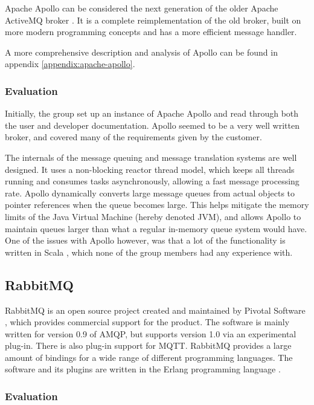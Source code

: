 Apache Apollo can be considered the next generation of the older Apache ActiveMQ broker \cite{activemq}. It is a complete reimplementation of the old broker, built on more modern programming concepts and has a more efficient message handler.

A more comprehensive description and analysis of Apollo can be found in appendix \ref{appendix:apache-apollo}.

\subsubsection{Evaluation}
\label{subsec:prestudies-existing_solutions-apache_apollo-evaluation}

Initially, the group set up an instance of Apache Apollo and read through both the user and developer documentation. Apollo seemed to be a very well written broker, and covered many of the requirements given by the customer.

The internals of the message queuing and message translation systems are well designed. It uses a non-blocking reactor thread model, which keeps all threads running and consumes tasks asynchronously, allowing a fast message processing rate. Apollo dynamically converts large message queues from actual objects to pointer references when the queue becomes large. This helps mitigate the memory limits of the Java Virtual Machine (hereby denoted JVM), and allows Apollo to maintain queues larger than what a regular in-memory queue system would have. One of the issues with Apollo however, was that a lot of the functionality is written in Scala  \cite{scala}, which none of the group members had any experience with.

\subsection{RabbitMQ}
\label{subsec:prestudies-existing_solutions-rabbitmq}

RabbitMQ \cite{rabbit-mq} is an open source project created and maintained by Pivotal Software \cite{pivotal-software}, which provides commercial support for the product. The software is mainly written for version 0.9 of AMQP, but supports version 1.0 via an experimental plug-in. There is also plug-in support for MQTT. RabbitMQ provides a large amount of bindings for a wide range of different programming languages. The software and its plugins are written in the Erlang programming language \cite{erlang}.

\subsubsection{Evaluation}
\label{subsec:prestudies-existing_solutions-rabbitmq-evaluation}

